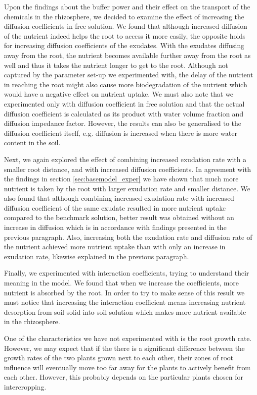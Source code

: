 \documentclass[11pt]{article}
\numberwithin{equation}{section}
\begin{document}
Upon the findings about the buffer power and their effect on the transport of the chemicals in the rhizosphere, we decided to examine the effect of increasing the diffusion coefficients in free solution. We found that although increased diffusion of the nutrient indeed helps the root to access it more easily, the opposite holds for increasing diffusion coefficients of the exudates. With the exudates diffusing away from the root, the nutrient becomes available further away from the root as well and thus it takes the nutrient longer to get to the root. Although not captured by the parameter set-up we experimented with, the delay of the nutrient in reaching the root might also cause more biodegradation of the nutrient which would have a negative effect on nutrient uptake. We must also note that we experimented only with diffusion coefficient in free solution and that the actual diffusion coefficient is calculated as its product with water volume fraction and diffusion impedance factor. However, the results can also be generalised to the diffusion coefficient itself, e.g. diffusion is increased when there is more water content in the soil.

Next, we again explored the effect of combining increased exudation rate with a smaller root distance, and with increased diffusion coefficients. In agreement with the findings in section \ref{sec:basemodel_exper} we have shown that much more nutrient is taken by the root with larger exudation rate and smaller distance. We also found that although combining increased exudation rate with increased diffusion coefficient of the same exudate resulted in more nutrient uptake compared to the benchmark solution, better result was obtained without an increase in diffusion which is in accordance with findings presented in the previous paragraph. Also, increasing both the exudation rate and diffusion rate of the nutrient achieved more nutrient uptake than with only an increase in exudation rate, likewise explained in the previous paragraph.

Finally, we experimented with interaction coefficients, trying to understand their meaning in the model. We found that when we increase the coefficients, more nutrient is absorbed by the root. In order to try to make sense of this result we must notice that increasing the interaction coefficient means increasing nutrient desorption from soil solid into soil solution which makes more nutrient available in the rhizosphere.

One of the characteristics we have not experimented with is the root growth rate. However, we may expect that if the there is a significant difference between the growth rates of the two plants grown next to each other, their zones of root influence will eventually move too far away for the plants to actively benefit from each other. However, this probably depends on the particular plants chosen for intercropping.
\end{document}
